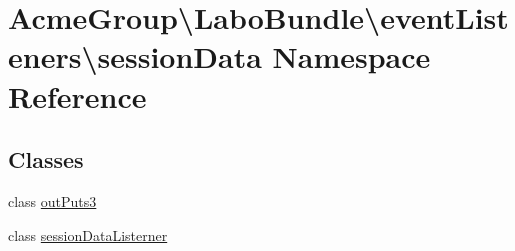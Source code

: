\hypertarget{namespace_acme_group_1_1_labo_bundle_1_1event_listeners_1_1session_data}{\section{Acme\+Group\textbackslash{}Labo\+Bundle\textbackslash{}event\+Listeners\textbackslash{}session\+Data Namespace Reference}
\label{namespace_acme_group_1_1_labo_bundle_1_1event_listeners_1_1session_data}
}
\subsection*{Classes}
\begin{DoxyCompactItemize}
\item 
class \hyperlink{class_acme_group_1_1_labo_bundle_1_1event_listeners_1_1session_data_1_1out_puts3}{out\+Puts3}
\item 
class \hyperlink{class_acme_group_1_1_labo_bundle_1_1event_listeners_1_1session_data_1_1session_data_listerner}{session\+Data\+Listerner}
\end{DoxyCompactItemize}
